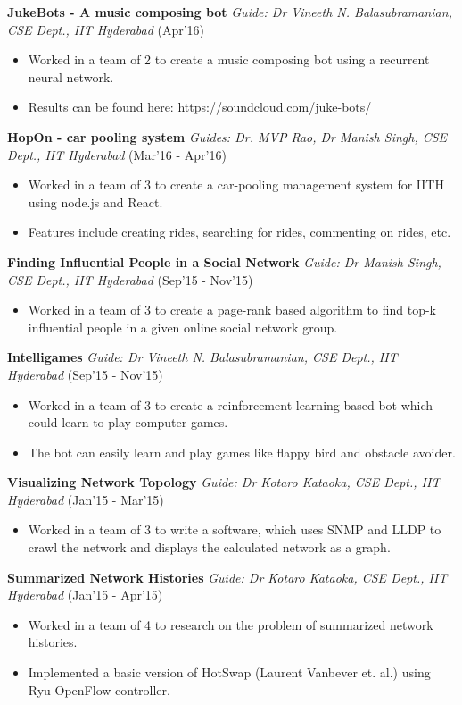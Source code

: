 \documentclass[8pt]{extarticle}
\begin{document}
\textbf{JukeBots - A music composing bot} \textit{Guide: Dr Vineeth N. Balasubramanian, CSE Dept., IIT Hyderabad} \hfill (Apr'16)
\begin{itemize}
\item Worked in a team of 2 to create a music composing bot using a recurrent neural network.
\item Results can be found here: \url{https://soundcloud.com/juke-bots/}
\end{itemize}
\space
\textbf{HopOn - car pooling system} \textit{Guides: Dr. MVP Rao, Dr Manish Singh, CSE Dept., IIT Hyderabad} \hfill (Mar'16 - Apr'16)
\begin{itemize}
\item Worked in a team of 3 to create a car-pooling management system for IITH using node.js and React.
\item Features include creating rides, searching for rides, commenting on rides, etc.
\end{itemize}
\space
\textbf{Finding Influential People in a Social Network} \textit{Guide: Dr Manish Singh, CSE Dept., IIT Hyderabad} \hfill (Sep'15 - Nov'15)
\begin{itemize}
\item Worked in a team of 3 to create a page-rank based algorithm to find top-k influential people in a given online social network group.
\end{itemize}
\space
\textbf{Intelligames} \textit{Guide: Dr Vineeth N. Balasubramanian, CSE Dept., IIT Hyderabad} \hfill (Sep'15 - Nov'15)
\begin{itemize}
\item Worked in a team of 3 to create a reinforcement learning based bot which could learn to play computer games.
\item The bot can easily learn and play games like flappy bird and obstacle avoider.
\end{itemize}
\space
\textbf{Visualizing Network Topology} \textit{Guide: Dr Kotaro Kataoka, CSE Dept., IIT Hyderabad} \hfill (Jan'15 - Mar'15)
\begin{itemize}
\item Worked in a team of 3 to write a software, which uses SNMP and LLDP to crawl the network and displays the calculated network as a
graph.
\end{itemize}
\space
\textbf{Summarized Network Histories} \textit{Guide: Dr Kotaro Kataoka, CSE Dept., IIT Hyderabad} \hfill (Jan'15 - Apr'15)
\begin{itemize}
\item Worked in a team of 4 to research on the problem of summarized network histories.
\item Implemented a basic version of HotSwap (Laurent Vanbever et. al.) using Ryu OpenFlow controller.
\end{itemize}
\end{document}
